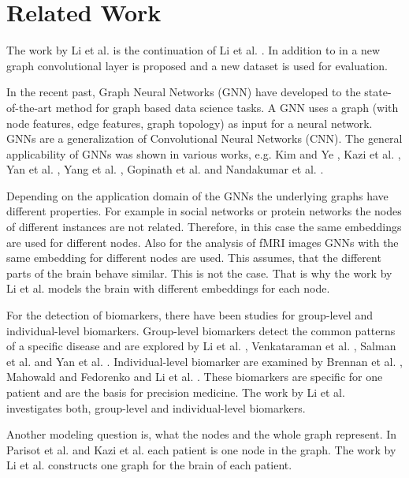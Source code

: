 \section{Related Work} \label{related_work}

The work by Li et al. \cite{LI2021102233} is the continuation of Li et al. \cite{10.1007/978-3-030-59728-3_61}. In addition to \cite{10.1007/978-3-030-59728-3_61} in \cite{LI2021102233} a new graph convolutional layer is proposed and a new dataset is used for evaluation.

In the recent past, Graph Neural Networks (GNN) have developed to the state-of-the-art method for graph based data science tasks.
A GNN uses a graph (with node features, edge features, graph topology) as input for a neural network. GNNs are a generalization of Convolutional Neural Networks (CNN).
The general applicability of GNNs was shown in various works, e.g. Kim and Ye \cite{10.3389/fnins.2020.00630},  Kazi et al. \cite{10.1007/978-3-030-20351-1_6}, Yan et al. \cite{10.1145/3292500.3330921}, Yang et al. \cite{10.1007/978-3-030-32248-9_89}, Gopinath et al. \cite{10.1007/978-3-030-20351-1_7} and Nandakumar et al. \cite{10.1007/978-3-030-32391-2_2}.

Depending on the application domain of the GNNs the underlying graphs have different properties. For example in social networks or protein networks the nodes of different instances are not related. Therefore, in this case the same embeddings are used for different nodes. 
Also for the analysis of fMRI images GNNs with the same embedding for different nodes are used. 
This assumes, that the different parts of the brain behave similar. This is not the case. That is why the work by Li et al. \cite{LI2021102233} models the brain with different embeddings for each node.

For the detection of biomarkers, there have been studies for group-level and individual-level biomarkers. Group-level biomarkers detect the common patterns of a specific disease and are explored by Li et al. \cite{10.1007/978-3-030-00931-1_24}, Venkataraman et al. \cite{Venkataraman2016BayesianCD}, Salman et al. \cite{SALMAN2019101747} and Yan et al. \cite{10.1145/3292500.3330921}. 
Individual-level biomarker are examined by Brennan et al. \cite{BRENNAN201927}, Mahowald and Fedorenko \cite{MAHOWALD201674} and Li et al. \cite{10.1007/978-3-030-32254-0_54}. These biomarkers are specific for one patient and are the basis for precision medicine. 
The work by Li et al. \cite{LI2021102233} investigates both, group-level and individual-level biomarkers.

Another modeling question is, what the nodes and the whole graph represent. In Parisot et al. \cite{PARISOT2018117} and Kazi et al. \cite{10.1007/978-3-030-20351-1_6} each patient is one node in the graph. The work by Li et al. \cite{LI2021102233} constructs one graph for the brain of each patient.
